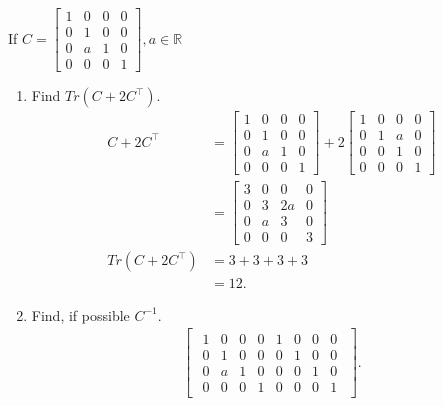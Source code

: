 \documentclass{zc-ust-hw}
\begin{document}
If $C=\begin{bmatrix} 1&0&0&0\\0&1&0&0\\0&a&1&0\\0&0&0&1 \end{bmatrix}, a \in \mathbb{R}$
\begin{enumerate}[label=\roman*.]
  \item Find $Tr\left( C+2C^\intercal \right)$.
    \begin{align}
      C+2C^\intercal &=
      \begin{bmatrix} 
        1 & 0 & 0 & 0 \\
        0 & 1 & 0 & 0 \\
        0 & a & 1 & 0 \\
        0 & 0 & 0 & 1
      \end{bmatrix} +
      2\begin{bmatrix} 
        1 & 0 & 0 & 0 \\
        0 & 1 & a & 0 \\
        0 & 0 & 1 & 0 \\
        0 & 0 & 0 & 1
      \end{bmatrix} \\
      &=
      \begin{bmatrix} 
        3 & 0 & 0  & 0 \\
        0 & 3 & 2a & 0 \\
        0 & a & 3  & 0 \\
        0 & 0 & 0  & 3
      \end{bmatrix}\\
      Tr\left( C+2C^\intercal \right) &= 3+3+3+3 \\
                                      &= 12
    .\end{align}
  \item Find, if possible $C^{-1}$.
    \begin{align}
      \begin{bmatrix} 
        \begin{array}{cccc|cccc}
          1 & 0 & 0 & 0 & 1 & 0 & 0 & 0 \\
          0 & 1 & 0 & 0 & 0 & 1 & 0 & 0 \\
          0 & a & 1 & 0 & 0 & 0 & 1 & 0 \\
          0 & 0 & 0 & 1 & 0 & 0 & 0 & 1
        \end{array}
      \end{bmatrix}
    .\end{align}
    \begin{align}

\end{align}
\end{enumerate}
\end{document}
